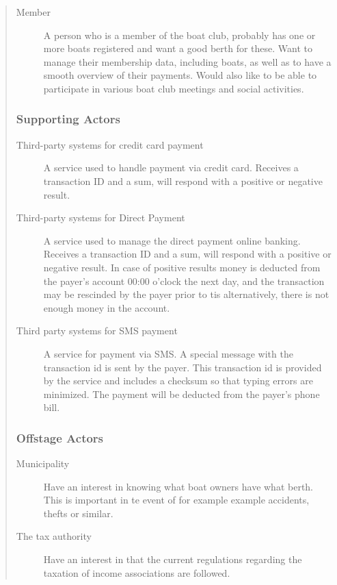 \begin{quote}
\begin{description}
  \item[Member]
  A person who is a member of the boat club, probably has one or more boats
  registered and want a good berth for these. Want to manage their membership
  data, including boats, as well as to have a smooth overview of their
  payments.  Would also like to be able to participate in various boat club
  meetings and social activities.
\end{description}


\subsubsection{Supporting Actors}
\begin{description}
  \item[Third-party systems for credit card payment]
  A service used to handle payment via credit card. Receives a transaction ID
  and a sum, will respond with a positive or negative result.

  \item[Third-party systems for Direct Payment]
  A service used to manage the direct payment online banking. Receives a
  transaction ID and a sum, will respond with a positive or negative result.
  In case of positive results money is deducted from the payer's account 00:00
  o'clock the next day, and the transaction may be rescinded by the payer prior
  to tis alternatively, there is not enough money in the account.
  
  \item[Third party systems for SMS payment]
  A service for payment via SMS. A special message with the transaction id is
  sent by the payer. This transaction id is provided by the service and
  includes a checksum so that typing errors are minimized.
  The payment will be deducted from the payer's phone bill.
\end{description}


\subsubsection{Offstage Actors}
\begin{description}
  \item[Municipality]
  Have an interest in knowing what boat owners have what berth. This is
  important in te event of for example example accidents, thefts or similar.
  
  \item[The tax authority]
  Have an interest in that the current regulations regarding the taxation of
  income associations are followed.
\end{description}



\end{quote}
